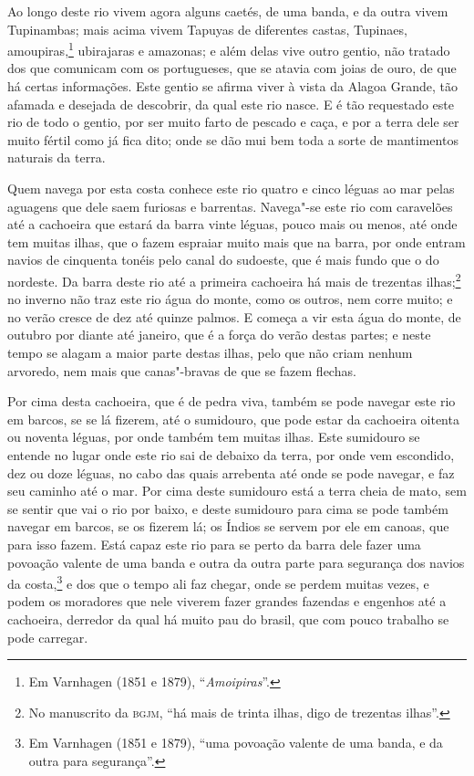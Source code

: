Ao longo deste rio vivem agora alguns caetés, de uma banda, e da outra vivem Tupinambas;
mais acima vivem Tapuyas de diferentes castas, Tupinaes, amoupiras,\footnote{ Em Varnhagen
(1851 e 1879), ``\textit{Amoipiras}''.} ubirajaras e amazonas; e além delas vive outro
gentio, não tratado dos que comunicam com os portugueses, que se atavia com joias de ouro,
de que há certas informações. Este gentio se afirma viver à vista da Alagoa Grande, tão
afamada e desejada de descobrir, da qual este rio nasce. E é tão requestado este rio de
todo o gentio, por ser muito farto de pescado e caça, e por a terra dele ser muito fértil
como já fica dito; onde se dão mui bem toda a sorte de mantimentos naturais da terra.

Quem navega por esta costa conhece este rio quatro e cinco léguas ao mar pelas aguagens
que dele saem furiosas e barrentas. Navega"-se este rio com caravelões até a cachoeira que
estará da barra vinte léguas, pouco mais ou menos, até onde tem muitas ilhas, que o fazem
espraiar muito mais que na barra, por onde entram navios de cinquenta tonéis pelo canal do
sudoeste, que é mais fundo que o do nordeste. Da barra deste rio até a primeira cachoeira
há mais de trezentas ilhas;\footnote{ No manuscrito da \textsc{bgjm}, ``há mais de trinta
ilhas, digo de trezentas ilhas''.} no inverno não traz este rio água do monte, como os
outros, nem corre muito; e no verão cresce de dez até quinze palmos. E começa a vir esta
água do monte, de outubro por diante até janeiro, que é a força do verão destas partes; e
neste tempo se alagam a maior parte destas ilhas, pelo que não criam nenhum arvoredo, nem
mais que canas"-bravas de que se fazem flechas.

Por cima desta cachoeira, que é de pedra viva, também se pode navegar este rio em barcos,
se se lá fizerem, até o sumidouro, que pode estar da cachoeira oitenta ou noventa léguas,
por onde também tem muitas ilhas. Este sumidouro se entende no lugar onde este rio sai de
debaixo da terra, por onde vem escondido, dez ou doze léguas, no cabo das quais arrebenta
até onde se pode navegar, e faz seu caminho até o mar. Por cima deste sumidouro está a
terra cheia de mato, sem se sentir que vai o rio por baixo, e deste sumidouro para cima se
pode também navegar em barcos, se os fizerem lá; os Índios se servem por ele em canoas,
que para isso fazem. Está capaz este rio para se perto da barra dele fazer uma povoação
valente de uma banda e outra da outra parte para segurança dos navios da costa,\footnote{
Em Varnhagen (1851 e 1879), ``uma povoação valente de uma banda, e da outra para
segurança''.} e dos que o tempo ali faz chegar, onde se perdem muitas vezes, e podem os
moradores que nele viverem fazer grandes fazendas e engenhos até a cachoeira, derredor da
qual há muito pau do brasil, que com pouco trabalho se pode carregar.

